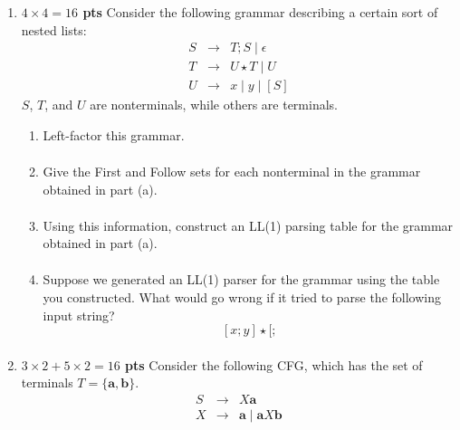 \documentclass[10pt]{article}
\newcommand {\pts}[1]{{\bf #1 pts}}
\begin{document}
\begin{enumerate}
\begin{center}
\begin{tikzpicture}[sibling distance=2em, level distance=3em]
        \end{tikzpicture}\end{center}

\newpage
\item \pts{$4\times 4 =16$} Consider the following grammar describing a certain sort of nested lists:
\[\begin{array}{cll}
S & \rightarrow & T;S \mid \epsilon \\
T & \rightarrow & U\star T \mid U \\
U & \rightarrow & x\mid y\mid [S]
\end{array}\]
$S$, $T$, and $U$ are nonterminals, while others are terminals.
\begin{enumerate}
  \item Left-factor this grammar.
            \begin{equation*}\begin{aligned}
            \end{aligned}\end{equation*}
  \item Give the First and Follow sets for each nonterminal in the grammar obtained in part (a).
            \begin{equation*}\begin{aligned}
            \end{aligned}\end{equation*}
  \item Using this information, construct an LL(1) parsing table for the grammar obtained in part (a).
            \begin{equation*}\begin{aligned}
            \end{aligned}\end{equation*}
  \item Suppose we generated an LL(1) parser for the grammar using the table you constructed. What would go wrong if it tried to parse the following input string?
  \[[x;y]\star [;\]
            \begin{equation*}\begin{aligned}
            \end{aligned}\end{equation*}
\end{enumerate}

\newpage
\item \pts{$3\times 2+5\times 2 =16$} Consider the following CFG, which has the set of terminals
$T = \{ \textbf{a}, \textbf{b} \}$.
\[\begin{array}{cll}
 S & \rightarrow & X \textbf{a} \\
X & \rightarrow & \textbf{a} \mid \textbf{a} X \textbf{b}
\end{array}\]


\end{enumerate}
\end{document}
